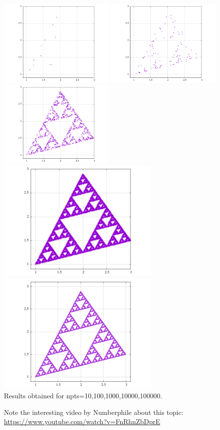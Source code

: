 \begin{center}
\includegraphics[width=5.7cm]{python_codes/fieldstone_172/results/pts_10.png}
\includegraphics[width=5.7cm]{python_codes/fieldstone_172/results/pts_100.png}
\includegraphics[width=5.7cm]{python_codes/fieldstone_172/results/pts_1000.png}\\
\includegraphics[width=8cm]{python_codes/fieldstone_172/results/pts_10000.png}
\includegraphics[width=8cm]{python_codes/fieldstone_172/results/pts_100000.png}\\
{\captionfont Results obtained for npts=10,100,1000,10000,100000.}
\end{center}


Note the interesting video by Numberphile about this topic: \url{https://www.youtube.com/watch?v=FnRhnZbDprE}













